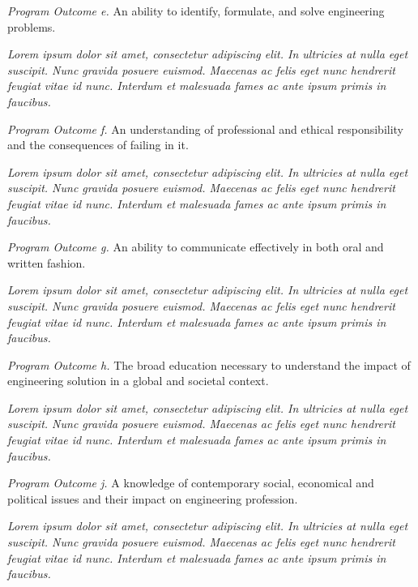 \documentclass[letterpaper]{../kuthesis/kuthesis}
\begin{document}
\textit{Program Outcome e.}  An ability to identify, formulate, and solve engineering problems.
\begin{adjustwidth}{0.5in}{0in}
\textit{Lorem ipsum dolor sit amet, consectetur adipiscing elit. In ultricies at nulla eget suscipit. Nunc gravida posuere euismod. Maecenas ac felis eget nunc hendrerit feugiat vitae id nunc. Interdum et malesuada fames ac ante ipsum primis in faucibus. }\\
\end{adjustwidth} 
\textit{Program Outcome f.}  An understanding of professional and ethical responsibility and the consequences of failing in it.
\begin{adjustwidth}{0.5in}{0in}
\textit{Lorem ipsum dolor sit amet, consectetur adipiscing elit. In ultricies at nulla eget suscipit. Nunc gravida posuere euismod. Maecenas ac felis eget nunc hendrerit feugiat vitae id nunc. Interdum et malesuada fames ac ante ipsum primis in faucibus. }\\
\end{adjustwidth} 
\textit{Program Outcome g.}  An ability to communicate effectively in both oral and written fashion.
\begin{adjustwidth}{0.5in}{0in}
\textit{Lorem ipsum dolor sit amet, consectetur adipiscing elit. In ultricies at nulla eget suscipit. Nunc gravida posuere euismod. Maecenas ac felis eget nunc hendrerit feugiat vitae id nunc. Interdum et malesuada fames ac ante ipsum primis in faucibus. }\\
\end{adjustwidth} 
\textit{Program Outcome h.}  The broad education necessary to understand the impact of engineering solution in a global and societal context.
\begin{adjustwidth}{0.5in}{0in}
\textit{Lorem ipsum dolor sit amet, consectetur adipiscing elit. In ultricies at nulla eget suscipit. Nunc gravida posuere euismod. Maecenas ac felis eget nunc hendrerit feugiat vitae id nunc. Interdum et malesuada fames ac ante ipsum primis in faucibus. }\\
\end{adjustwidth} 
\textit{Program Outcome j.}  A knowledge of contemporary social, economical and political issues and their impact on engineering profession.
\begin{adjustwidth}{0.5in}{0in}
\textit{Lorem ipsum dolor sit amet, consectetur adipiscing elit. In ultricies at nulla eget suscipit. Nunc gravida posuere euismod. Maecenas ac felis eget nunc hendrerit feugiat vitae id nunc. Interdum et malesuada fames ac ante ipsum primis in faucibus. }\\
\end{adjustwidth}
\end{document}
